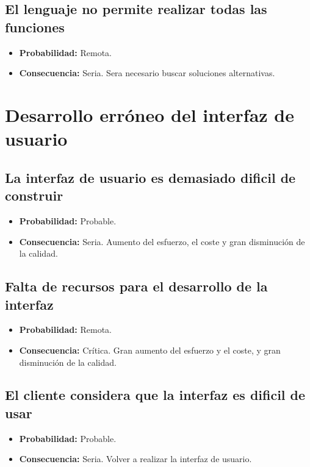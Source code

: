 \documentclass[spanish,a4paper,12pt]{report}	%
\begin{document}
\subsection*{El lenguaje no permite realizar todas las funciones}
	\begin{itemize}
		\item \textbf {Probabilidad: }Remota.
		\item \textbf {Consecuencia: }Seria. Sera necesario buscar soluciones alternativas.
	\end{itemize}


%
\section{Desarrollo erróneo del interfaz de usuario}

\subsection*{La interfaz de usuario es demasiado dificil de construir}
	\begin{itemize}
		\item \textbf {Probabilidad: }Probable.
		\item \textbf {Consecuencia: }Seria. Aumento del esfuerzo, el coste y gran disminución de la calidad.
	\end{itemize}

\subsection*{Falta de recursos para el desarrollo de la interfaz}
	\begin{itemize}
		\item \textbf {Probabilidad: }Remota.
		\item \textbf {Consecuencia: }Crítica. Gran aumento del esfuerzo y el coste, y gran disminución de la calidad.
	\end{itemize}

\subsection*{El cliente considera que la interfaz es dificil de usar}
	\begin{itemize}
		\item \textbf {Probabilidad: }Probable.
		\item \textbf {Consecuencia: }Seria. Volver a realizar la interfaz de usuario.
	\end{itemize}
\end{document}
